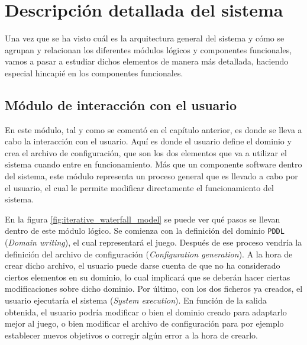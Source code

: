 
\chapter{Descripción detallada del sistema}
\label{chap:desc}

Una vez que se ha visto cuál es la arquitectura general del sistema y cómo se agrupan
y relacionan los diferentes módulos lógicos y componentes funcionales, vamos a pasar
a estudiar dichos elementos de manera más detallada, haciendo especial hincapié en los
componentes funcionales.

\section{Módulo de interacción con el usuario}

En este módulo, tal y como se comentó en el capítulo anterior, es donde se lleva a cabo
la interacción con el usuario. Aquí es donde el usuario define el dominio y crea el archivo
de configuración, que son los dos elementos que va a utilizar el sistema cuando entre en
funcionamiento. Más que un componente software dentro del sistema, este módulo representa un
proceso general que es llevado a cabo por el usuario, el cual le permite modificar directamente
el funcionamiento del sistema.

En la figura \ref{fig:iterative_waterfall_model} se puede ver qué pasos se llevan dentro de este
módulo lógico. Se comienza con la definición del dominio \texttt{PDDL} (\textit{Domain writing}), el cual
representará el juego. Después de ese proceso vendría la definición del archivo de configuración
(\textit{Configuration generation}). A la hora de crear dicho archivo, el usuario puede darse cuenta de que no ha
considerado ciertos elementos en su dominio, lo cual implicará que se deberán hacer ciertas modificaciones
sobre dicho dominio. Por último, con los dos ficheros ya creados, el usuario ejecutaría el sistema
(\textit{System execution}). En función de la salida obtenida, el usuario podría modificar o bien el
dominio creado para adaptarlo mejor al juego, o bien modificar el archivo de configuración para por ejemplo
establecer nuevos objetivos o corregir algún error a la hora de crearlo.

